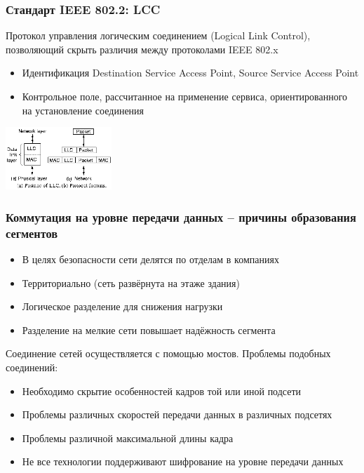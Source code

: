 \documentclass[utf8]{beamer}
\begin{document}
\begin{frame}
\frametitle{Стандарт IEEE 802.2: LCC}
Протокол управления логическим соединением (Logical Link Control), позволяющий скрыть различия между протоколами IEEE 802.x
\begin{itemize}
\item Идентификация Destination Service Access Point, Source Service Access Point
\item Контрольное поле, рассчитанное на применение сервиса, ориентированного на установление соединения

\end{itemize}
\begin{center}
\includegraphics[width=0.3\textwidth]{pic/llc.png}
\end{center}
\end{frame}
\begin{frame}
\frametitle{Коммутация на уровне передачи данных -- причины образования сегментов}
\begin{itemize}
\item В целях безопасности сети делятся по отделам в компаниях
\item Территориально (сеть развёрнута на этаже здания)
\item Логическое разделение для снижения нагрузки
\item Разделение на мелкие сети повышает надёжность сегмента
\end{itemize}
Соединение сетей осуществляется с помощью мостов. Проблемы подобных соединений:
\begin{itemize}
\item Необходимо скрытие особенностей кадров той или иной подсети
\item Проблемы различных скоростей передачи данных в различных подсетях
\item Проблемы различной максимальной длины кадра
\item Не все технологии поддерживают шифрование на уровне передачи данных
\end{itemize}
\end{frame}
\end{document}
